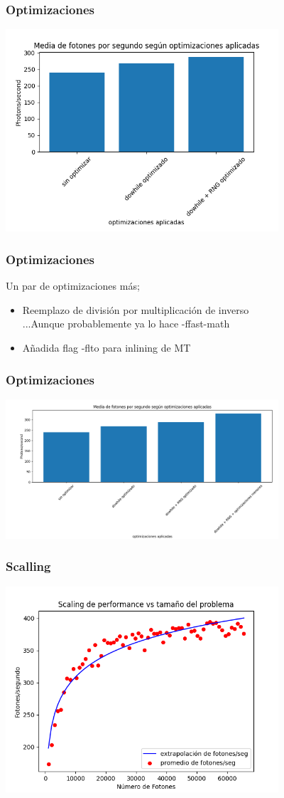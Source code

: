 \documentclass{beamer}
\begin{document}
\begin{frame}
    \frametitle{Optimizaciones}
    \includegraphics[width=4in]{imagenes/optimizaciones_2.png}

\end{frame}

\begin{frame}
    \frametitle{Optimizaciones}
    Un par de optimizaciones más; \\\pause
    \begin{itemize}
        \item<1-> Reemplazo de división por multiplicación de inverso \\\pause
        ...Aunque probablemente ya lo hace -ffast-math \\\pause
        \item<2-> Añadida flag -flto para inlining de MT
       \end{itemize}
       
\end{frame}

\begin{frame}
    \frametitle{Optimizaciones}
    \includegraphics[width=4in]{imagenes/optimizaciones_3.png}
\end{frame}

\begin{frame}
    \frametitle{Scalling}
    \includegraphics[width=4in]{imagenes/scaling.png}    
\end{frame}
\end{document}
